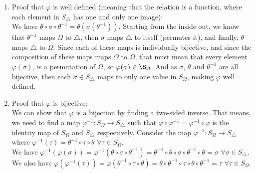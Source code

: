 \documentclass[12pt]{article}
\begin{document}
    \begin{enumerate}[label=\textbf{\alph*.}]
        \item 
            Proof that $\varphi$ is well defined
            (meaning that the relation is a function, where each
            element in $S_\triangle$ has one and only one image): \\
            We have $\theta \circ \sigma \circ \theta^{-1}
            = \theta(\sigma(\theta^{-1}))$.
            Starting from the inside out,
            we know that $\theta^{-1}$ maps $\Omega$ to $\triangle$,
            then $\sigma$ maps $\triangle$ to itself (permutes it),
            and finally, $\theta$ maps $\triangle$ to $\Omega$.
            Since each of these maps is individually bijective,
            and since the composition of these maps maps $\Omega$
            to $\Omega$,
            that must mean that every element $\varphi(\sigma)$,
            is a permutation of $\Omega$,
            so  $\varphi(\sigma) \in \S_\Omega$.
            And as $\sigma$, $\theta$ and $\theta^{-1}$ are all bijective,
            then each $\sigma \in S_\triangle$ maps to only one value
            in $S_\Omega$,
            making $\varphi$ well defined.
        \item
            Proof that $\varphi$ is bijective: \\
            We can show that $\varphi$ is a bijection by finding a two-sided
            inverse.
            That means, we need to find a map
            $\varphi^{-1}: S_\Omega \to S_\triangle$
            such that $\varphi \circ \varphi^{-1}
            = \varphi^{-1} \circ \varphi$ is the identity map of 
            $S_\Omega$ and $S_\triangle$ respectively.
            Consider the map $\varphi^{-1}: S_\Omega \to S_\triangle$
            where $\varphi^{-1}(\tau)
            = \theta^{-1} \circ \tau \circ \theta$
            $\forall \tau \in S_\Omega$. \\
            We have $\varphi^{-1}(\varphi(\sigma))
            = \varphi^{-1}(\theta \circ \sigma \circ \theta^{-1})
            = \theta^{-1} \circ \theta \circ \sigma \circ \theta^{-1}
            \circ \theta
            = \sigma$ $\forall \sigma \in S_\triangle$. \\
            We also have $\varphi(\varphi^{-1}(\tau))
            = \varphi(\theta^{-1} \circ \tau \circ \theta)
            = \theta \circ \theta^{-1} \circ \tau \circ \theta
            \circ \theta^{-1}
            = \tau$ $\forall \tau \in S_\Omega$. \\

\end{enumerate}
\end{document}
